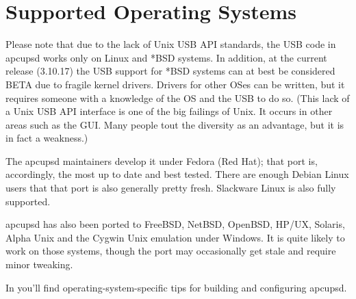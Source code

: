 \label{Supported-Operating-Systems_003b}
\section*{Supported Operating Systems}

\label{index-Supported-OSes-8}
\label{index-OSes-Supported-9}
Please note that due to the lack of Unix USB API standards, the USB code in
apcupsd works only on Linux and *BSD systems. In addition, at the current
release (3.10.17) the USB support for *BSD systems can at best be considered
BETA due to fragile kernel drivers. Drivers for other OSes can be written, but
it requires someone with a knowledge of the OS and the USB to do so.  (This
lack of a Unix USB API interface is one of the big failings of Unix.  It
occurs in other areas such as the GUI. Many people tout the diversity as an
advantage, but it is in fact a weakness.)  

The apcupsd maintainers develop it under Fedora (Red Hat); that port is,
accordingly, the most up to date and best tested.  There are enough Debian
Linux users that that port is also generally pretty fresh.  Slackware Linux is
also fully supported.  

apcupsd has also been ported to FreeBSD, NetBSD, OpenBSD, HP/UX, Solaris,
Alpha Unix and the Cygwin Unix emulation under Windows. It is quite likely to
work on those systems, though the port may occasionally get stale and require
minor tweaking.  

In 
you'll find operating-system-specific tips for building and configuring
apcupsd.  
